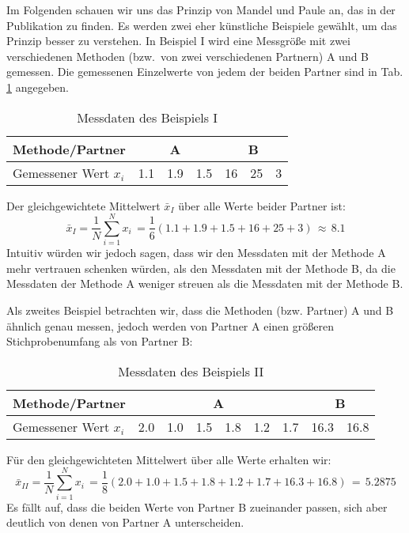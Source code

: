 Im Folgenden schauen wir uns das Prinzip von Mandel und Paule an, das
in der Publikation \cite{Pau82} zu finden. Es werden zwei eher künstliche Beispiele gewählt, um das Prinzip besser zu verstehen.
In Beispiel I wird eine Messgröße mit zwei verschiedenen Methoden (bzw.\ von zwei verschiedenen Partnern) A und B gemessen.
Die gemessenen Einzelwerte von jedem der beiden Partner sind in Tab. \ref*{tab:Beispiel_I}
angegeben.
\begin{table}[!htb]
	\caption{Messdaten des Beispiels I}
	\begin{center}
	\begin{tabular}{l| rrr |rrr}
		\hline
		Methode/Partner & \multicolumn{3}{c}{A} \vline & \multicolumn{3}{c}{B} \\ \hline
		Gemessener Wert $x_i$ & 1.1 & 1.9 & 1.5 & 16 & 25 & 3 \\ \hline
	\end{tabular}
\end{center}
\label{tab:Beispiel_I}
\end{table}

Der gleichgewichtete Mittelwert $\bar x_I$ über alle Werte beider Partner ist:
 \begin{equation}
 \bar x_I = \frac{1}{N} \sum_{i=1}^N x_i \, = \frac{1}{6}\left( 1.1 + 1.9 + 1.5 + 16 + 25 + 3 \right) \, \approx \, 8.1
 \end{equation}
 Intuitiv würden wir jedoch sagen, dass wir den Messdaten mit der Methode A
 mehr vertrauen schenken würden, als den Messdaten mit der Methode B, da die
 Messdaten der Methode A weniger streuen als die Messdaten mit der Methode B.

 Als zweites Beispiel betrachten wir, dass die Methoden (bzw. Partner) A und B ähnlich
 genau messen, jedoch werden von Partner A einen größeren Stichprobenumfang
 als von Partner B:


 \begin{table}[!htb]
 	\caption{Messdaten des Beispiels II}
 	\begin{center}
 		\begin{tabular}{l| rrrrrr |rr}
 			\hline
 			Methode/Partner & \multicolumn{6}{c}{A} \vline & \multicolumn{2}{c}{B} \\ \hline
 			Gemessener Wert $x_i$ & 2.0 & 1.0 & 1.5 & 1.8 & 1.2 & 1.7
 			& 16.3 & 16.8\\ \hline
 		\end{tabular}
 	\end{center}
 	\label{tab:Beispiel_II}
 \end{table}
Für den gleichgewichteten Mittelwert über alle Werte erhalten wir:
 \begin{equation}
 \bar x_{II} = \frac{1}{N} \sum_{i=1}^N x_i \, = \frac{1}{8}\left( 2.0 + 1.0 + 1.5 + 1.8 + 1.2 + 1.7 + 16.3 + 16.8 \right) \, = \, 5.2875
\label{eq:einfachesMittelII}
 \end{equation}
Es fällt auf, dass die beiden Werte von Partner B zueinander passen, sich aber deutlich von denen von Partner A unterscheiden.

